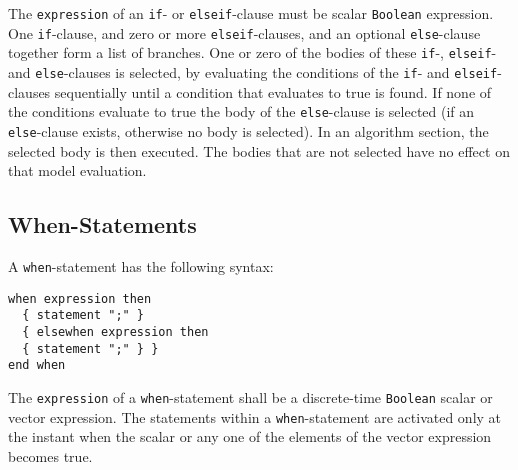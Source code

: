 The \lstinline!expression! of an \lstinline!if!- or \lstinline!elseif!-clause must be scalar \lstinline!Boolean! expression.
One \lstinline!if!-clause, and zero or more \lstinline!elseif!-clauses, and an optional \lstinline!else!-clause together form a list of branches.
One or zero of the bodies of these \lstinline!if!-, \lstinline!elseif!- and \lstinline!else!-clauses is selected, by evaluating the conditions of the \lstinline!if!- and \lstinline!elseif!-clauses sequentially until a condition that evaluates to true is found.
If none of the conditions evaluate to true the body of the \lstinline!else!-clause is selected (if an \lstinline!else!-clause exists, otherwise no body is selected).
In an algorithm section, the selected body is then executed.
The bodies that are not selected have no effect on that model evaluation.

\subsection{When-Statements}\label{when-statements}

A \lstinline!when!-statement has the following syntax:
\begin{lstlisting}[language=grammar]
when expression then
  { statement ";" }
  { elsewhen expression then
  { statement ";" } }
end when
\end{lstlisting}

The \lstinline!expression! of a \lstinline!when!-statement shall be a discrete-time \lstinline!Boolean! scalar or vector expression.
The statements within a \lstinline!when!-statement are activated only at the instant when the scalar or any one of the elements of the vector expression becomes true.

